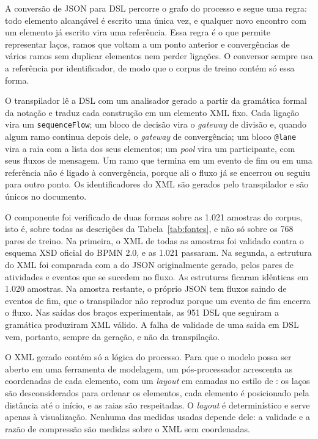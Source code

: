 A conversão de JSON para DSL percorre o grafo do processo e segue uma regra: todo elemento alcançável é escrito uma única vez, e qualquer novo encontro com um elemento já escrito vira uma referência. Essa regra é o que permite representar laços, ramos que voltam a um ponto anterior e convergências de vários ramos sem duplicar elementos nem perder ligações. O conversor sempre usa a referência por identificador, de modo que o corpus de treino contém só essa forma.

O transpilador lê a DSL com um analisador gerado a partir da gramática formal da notação e traduz cada construção em um elemento XML fixo. Cada ligação vira um \texttt{sequenceFlow}; um bloco de decisão vira o \textit{gateway} de divisão e, quando algum ramo continua depois dele, o \textit{gateway} de convergência; um bloco \texttt{@lane} vira a raia com a lista dos seus elementos; um \textit{pool} vira um participante, com seus fluxos de mensagem. Um ramo que termina em um evento de fim ou em uma referência não é ligado à convergência, porque ali o fluxo já se encerrou ou seguiu para outro ponto. Os identificadores do XML são gerados pelo transpilador e são únicos no documento.

O componente foi verificado de duas formas sobre as 1.021 amostras do corpus, isto é, sobre todas as descrições da Tabela~\ref{tab:fontes}, e não só sobre os 768 pares de treino. Na primeira, o XML de todas as amostras foi validado contra o esquema XSD oficial do BPMN 2.0, e as 1.021 passaram. Na segunda, a estrutura do XML foi comparada com a do JSON originalmente gerado, pelos pares de atividades e eventos que se sucedem no fluxo. As estruturas ficaram idênticas em 1.020 amostras. Na amostra restante, o próprio JSON tem fluxos saindo de eventos de fim, que o transpilador não reproduz porque um evento de fim encerra o fluxo. Nas saídas dos braços experimentais, as 951 DSL que seguiram a gramática produziram XML válido. A falha de validade de uma saída em DSL vem, portanto, sempre da geração, e não da transpilação.

O XML gerado contém só a lógica do processo. Para que o modelo possa ser aberto em uma ferramenta de modelagem, um pós-processador acrescenta as coordenadas de cada elemento, com um \textit{layout} em camadas no estilo de : os laços são desconsiderados para ordenar os elementos, cada elemento é posicionado pela distância até o início, e as raias são respeitadas. O \textit{layout} é determinístico e serve apenas à visualização. Nenhuma das medidas usadas depende dele: a validade e a razão de compressão são medidas sobre o XML sem coordenadas.

